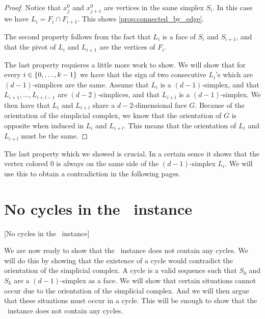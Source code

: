 \begin{proof}
    Notice that $x_j^0$ and $x_{j+1}^0$ are vertices in the same simplex $S_i$. In this case we have $L_i = F_i \cap F_{i+1}$. This shows \ref{prop:connected_by_edge}. \par
    The second property follows from the fact that $L_i$ is a face of $S_i$ and $S_{i+1}$, and that the pivot of $L_i$ and $L_{i+1}$ are the vertices of $F_i$. \par
    The last property requieres a little more work to show. We will show that for every $i \in \left\{0, \dots, k-1\right\}$ we have that the sign of two consecutive $L_i$'s which are $(d-1)$-simplices are the same. Assume that $L_i$ is a $(d-1)$-simplex, and that $L_{i+1}, \dots, L_{i+l-1}$ are $(d-2)$-simplices, and that $L_{i+l}$ is a $(d-1)$-simplex. We then have that $L_i$ and $L_{i+l}$ share a $d-2$-dimensional face $G$. Because of the orientation of the simplicial complex, we know that the orientation of $G$ is opposite when induced in $L_i$ and $L_{i+l}$. This means that the orientation of $L_i$ and $L_{i+l}$ must be the same.
\end{proof}
The last property which we showed is crucial. In a certain sence it shows that the vertex colored $0$ is always on the same side of the $(d-1)$-simplex $L_i$. We will use this to obtain a contradiction in the following pages.

\section{No cycles in the \EndOfLine\ instance}[No cycles in the \EndOfLine\ instance]

We are now ready to show that the \EndOfLine\ instance does not contain any cycles. We will do this by showing that the existence of a cycle would contradict the orientation of the simplicial complex. A cycle is a valid sequence such that $S_0$ and $S_k$ are a $(d-1)$-simplex as a face. We will show that certain situations cannot occur due to the orientation of the simplicial complex. And we will then argue that these situations must occur in a cycle. This will be enough to show that the \EndOfLine\ instance does not contain any cycles.
